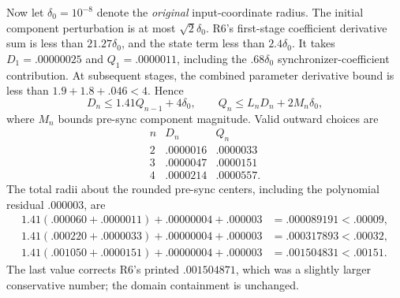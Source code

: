 \documentclass[11pt,a4paper]{article}
\numberwithin{equation}{section}
\begin{document}
Now let $\delta_0=10^{-8}$ denote the \emph{original} input-coordinate
radius. The initial component perturbation is at most $\sqrt2\delta_0$.
R6's first-stage coefficient derivative sum is less than $21.27\delta_0$,
and the state term less than $2.4\delta_0$. It takes
$D_1=.00000025$ and $Q_1=.0000011$, including the
$.68\delta_0$ synchronizer-coefficient contribution.
At subsequent stages, the combined parameter derivative bound is
less than $1.9+1.8+.046<4$. Hence
\begin{equation}\label{eq:boxrecurrence}
D_n\leq1.41Q_{n-1}+4\delta_0,\qquad
Q_n\leq L_nD_n+2M_n\delta_0,
\end{equation}
where $M_n$ bounds pre-sync component magnitude. Valid outward choices are
\[
\begin{array}{c|cc}
n&D_n&Q_n\\ \hline
2&.0000016&.0000033\\
3&.0000047&.0000151\\
4&.0000214&.0000557 .
\end{array}
\]
The total radii about the rounded pre-sync centers, including the polynomial
residual $.000003$, are
\[
\begin{aligned}
1.41(.000060+.0000011)+.00000004+.000003
&=.000089191<.00009,\\
1.41(.000220+.0000033)+.00000004+.000003
&=.000317893<.00032,\\
1.41(.001050+.0000151)+.00000004+.000003
&=.001504831<.00151 .
\end{aligned}
\]
The last value corrects R6's printed $.001504871$, which was a slightly
larger conservative number; the domain containment is unchanged.
\end{document}
